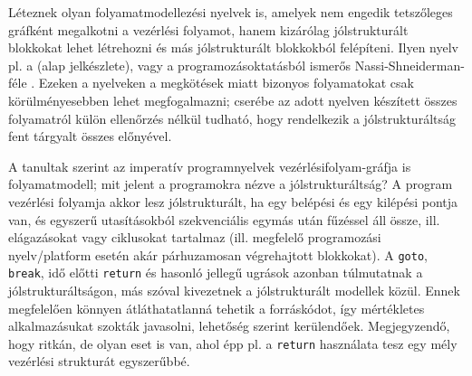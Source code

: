 Léteznek olyan folyamatmodellezési nyelvek is, amelyek nem engedik tetszőleges gráfként megalkotni a vezérlési folyamot, hanem kizárólag jólstrukturált blokkokat lehet létrehozni és más jólstrukturált blokkokból felépíteni. Ilyen nyelv pl. a  (alap jelkészlete), vagy a programozásoktatásból ismerős Nassi-Shneiderman-féle . Ezeken a nyelveken a megkötések miatt bizonyos folyamatokat csak körülményesebben lehet megfogalmazni; cserébe az adott nyelven készített összes folyamatról külön ellenőrzés nélkül tudható, hogy rendelkezik a jólstrukturáltság fent tárgyalt összes előnyével.

A tanultak szerint az imperatív programnyelvek vezérlésifolyam-gráfja is folyamatmodell; mit jelent a programokra nézve a jólstrukturáltság? A program vezérlési folyamja akkor lesz jólstrukturált, ha egy belépési és egy kilépési pontja van, és egyszerű utasításokból szekvenciális egymás után fűzéssel áll össze, ill. elágazásokat vagy ciklusokat tartalmaz (ill. megfelelő programozási nyelv/platform esetén akár párhuzamosan végrehajtott blokkokat). A \lstinline{goto}, \lstinline{break}, idő előtti \lstinline{return} és hasonló jellegű ugrások azonban túlmutatnak a jólstrukturáltságon, más szóval kivezetnek a jólstrukturált modellek közül.  Ennek megfelelően könnyen átláthatatlanná tehetik a forráskódot, így mértékletes alkalmazásukat szokták javasolni, lehetőség szerint kerülendőek. Megjegyzendő, hogy ritkán, de olyan eset is van, ahol épp pl. a \lstinline{return} használata tesz egy mély vezérlési strukturát egyszerűbbé. 

% 
% 

% 
% 
% 
% 
% 
% 


%
%
%


